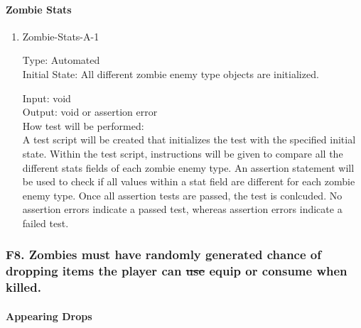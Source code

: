 \documentclass[12pt, titlepage]{article}
\DeclareRobustCommand{\hsout}[1]{\texorpdfstring{\sout{#1}}{#1}}
\newcounter{ftnum}
\begin{document}
\paragraph{Zombie Stats}

\begin{enumerate}

\item{Zombie-Stats-A-1\\}  \label{F7-1}

Type: Automated\\
					
Initial State: All different zombie enemy type objects are initialized.
					
Input: void \\
					
Output: void or assertion error \\
					
How test will be performed:\\ A test script will be created that initializes the test with the specified initial state. Within the test script, instructions will be given to compare all the different stats fields of each zombie enemy type. An assertion statement will be used to check if all values within a stat field are different for each zombie enemy type. Once all assertion tests are passed, the test is conlcuded. No assertion errors indicate a passed test, whereas assertion errors indicate a failed test.\\

\end{enumerate}

\subsubsection{{\color{magenta} F8.} Zombies must have randomly generated chance of dropping items the player can \hsout{use} {\color{magenta} equip} or consume when killed.} 

\paragraph{Appearing Drops}
\end{document}
